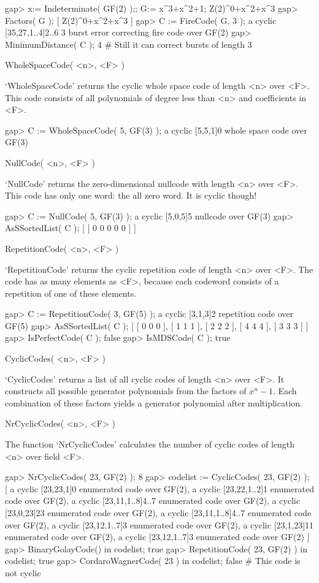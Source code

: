\beginexample
gap> x:= Indeterminate( GF(2) );; G:= x^3+x^2+1;
Z(2)^0+x^2+x^3
gap> Factors( G );
[ Z(2)^0+x^2+x^3 ]
gap> C := FireCode( G, 3 );
a cyclic [35,27,1..4]2..6 3 burst error correcting fire code over GF(2)
gap> MinimumDistance( C );
4     # Still it can correct bursts of length 3 
\endexample

\>WholeSpaceCode( <n>, <F> )

`WholeSpaceCode' returns  the cyclic whole space code  of length <n> over
<F>. This code consists  of all polynomials of  degree less than <n>  and
coefficients in <F>.

\beginexample
gap> C := WholeSpaceCode( 5, GF(3) );
a cyclic [5,5,1]0 whole space code over GF(3)
\endexample

\>NullCode( <n>, <F> )

`NullCode' returns  the  zero-dimensional nullcode with  length  <n> over
<F>. This code  has only  one word: the  all zero  word. It is   cyclic
though!

\beginexample
gap> C := NullCode( 5, GF(3) );
a cyclic [5,0,5]5 nullcode over GF(3)
gap> AsSSortedList( C );
[ [ 0 0 0 0 0 ] ]
\endexample

\>RepetitionCode( <n>, <F> )

`RepetitionCode' returns the  cyclic repetition code  of length  <n> over
<F>. The code has as many elements as <F>, because each codeword consists
of a repetition of one of these elements.

\beginexample
gap> C := RepetitionCode( 3, GF(5) );
a cyclic [3,1,3]2 repetition code over GF(5)
gap> AsSSortedList( C );
[ [ 0 0 0 ], [ 1 1 1 ], [ 2 2 2 ], [ 4 4 4 ], [ 3 3 3 ] ]
gap> IsPerfectCode( C );
false
gap> IsMDSCode( C );
true 
\endexample

\>CyclicCodes( <n>, <F> )

`CyclicCodes' returns  a list  of all  cyclic  codes of  length  <n> over
<F>. It constructs all possible generator polynomials from the factors of
$x^n-1$. Each combination of these  factors yields a generator polynomial
after multiplication.

\>NrCyclicCodes( <n>, <F> )

The function  `NrCyclicCodes' calculates the  number  of cyclic  codes of
length <n> over field <F>.

\beginexample
gap> NrCyclicCodes( 23, GF(2) );
8
gap> codelist := CyclicCodes( 23, GF(2) );
[ a cyclic [23,23,1]0 enumerated code over GF(2), 
  a cyclic [23,22,1..2]1 enumerated code over GF(2), 
  a cyclic [23,11,1..8]4..7 enumerated code over GF(2), 
  a cyclic [23,0,23]23 enumerated code over GF(2), 
  a cyclic [23,11,1..8]4..7 enumerated code over GF(2), 
  a cyclic [23,12,1..7]3 enumerated code over GF(2), 
  a cyclic [23,1,23]11 enumerated code over GF(2), 
  a cyclic [23,12,1..7]3 enumerated code over GF(2) ]
gap> BinaryGolayCode() in codelist;
true
gap> RepetitionCode( 23, GF(2) ) in codelist;
true
gap> CordaroWagnerCode( 23 ) in codelist;
false    # This code is not cyclic 
\endexample

